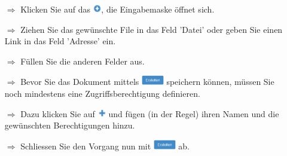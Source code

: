 \documentclass{article}
\begin{document}
\begin{multicols}{2}

\begin{tcolorbox}[colback=blue!5,colframe=blue!40!black,title=Dokumente hochladen]
\begin{itemize}
  \item[$\Longrightarrow$] Klicken Sie auf das \includegraphics[height=10pt]{Icons/Plussymbol.jpg}, die Eingabemaske öffnet sich.
  \item[$\Longrightarrow$] Ziehen Sie das gewünschte File in das Feld 'Datei' oder geben Sie einen Link in das Feld 'Adresse' ein.
  \item[$\Longrightarrow$] Füllen Sie die anderen Felder aus.
  \item[$\Longrightarrow$] Bevor Sie das Dokument mittels \includegraphics[height=12pt]{Icons/B_Erstellen.jpg} speichern können, müssen Sie noch mindestens eine Zugriffsberechtigung definieren. 
	\item[$\Longrightarrow$] Dazu klicken Sie auf \includegraphics[height=10pt]{Icons/Pluszeichen.jpg} und fügen (in der Regel) ihren Namen und die gewünschten Berechtigungen hinzu.
	\item[$\Longrightarrow$] Schliessen Sie den Vorgang nun mit \includegraphics[height=12pt]{Icons/B_Erstellen.jpg} ab.
\end{itemize}
\end{tcolorbox}



\end{multicols}
\end{document}
